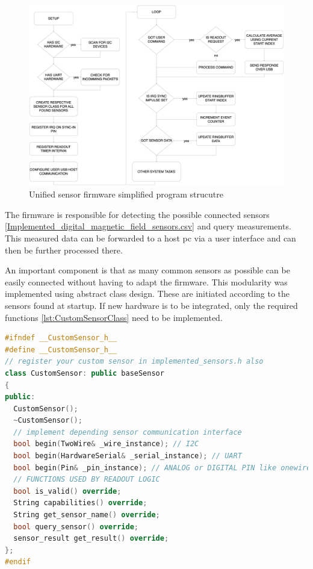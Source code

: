 \begin{figure}
\centering
\includegraphics{./generated_images/border_Unified_sensor_firmware_simplified_program_strucutre.png}
\caption{Unified sensor firmware simplified program strucutre
\label{Unified_sensor_firmware_simplified_program_strucutre.png}}
\end{figure}

The firmware is responsible for detecting the possible connected sensors
\ref{Implemented_digital_magnetic_field_sensors.csv} and query
measurements. This measured data can be forwarded to a host \gls{pc} via
a user interface and can then be further processed there.

An important component is that as many common sensors as possible can be
easily connected without having to adapt the firmware. This modularity
was implemented using abstract class design. These are initiated
according to the sensors found at startup. If new hardware is to be
integrated, only the required functions \ref{lst:CustomSensorClass} need
to be implemented.

\begin{lstlisting}[language={C++}, caption={CustomSensor-Class for adding new sensor hardware support}, label=lst:CustomSensorClass]
#ifndef __CustomSensor_h__
#define __CustomSensor_h__
// register your custom sensor in implemented_sensors.h also
class CustomSensor: public baseSensor
{
public:
  CustomSensor();
  ~CustomSensor();
  // implement depending sensor communication interface
  bool begin(TwoWire& _wire_instance); // I2C
  bool begin(HardwareSerial& _serial_instance); // UART
  bool begin(Pin& _pin_instance); // ANALOG or DIGITAL PIN like onewire
  // FUNCTIONS USED BY READOUT LOGIC
  bool is_valid() override;
  String capabilities() override;
  String get_sensor_name() override;
  bool query_sensor() override;
  sensor_result get_result() override;        
};
#endif
\end{lstlisting}

